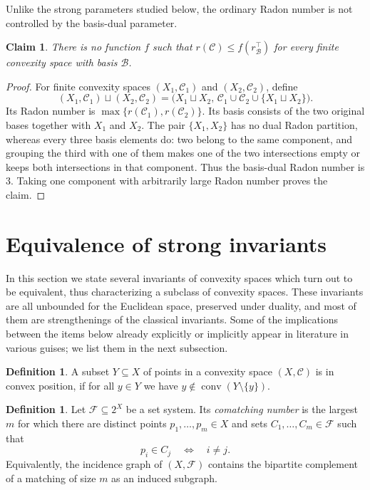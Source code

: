 \documentclass[11pt]{article}
\newtheorem{claim}[thm]{Claim}
\theoremstyle{definition}
\newtheorem{definition}[thm]{Definition}
\newcommand{\F}{\mathcal{F}}
\newcommand{\C}{\mathcal{C}}
\newcommand{\B}{\mathcal{B}}
\newcommand{\conv}{\operatorname{conv}}
\begin{document}
Unlike the strong parameters studied below, the ordinary Radon number is not controlled by the basis-dual parameter.

\begin{claim}\label{cl:noDualRadonBound}
There is no function $f$ such that $r(\C)\le f(r^\top_{\B})$ for every finite convexity space with basis $\B$.
\end{claim}

\begin{proof}
For finite convexity spaces $(X_1,\C_1)$ and $(X_2,\C_2)$, define
\[
(X_1,\C_1)\sqcup(X_2,\C_2)
=\bigl(X_1\sqcup X_2,\,\C_1\cup\C_2\cup\{X_1\sqcup X_2\}\bigr).
\]
Its Radon number is $\max\{r(\C_1),r(\C_2)\}$. Its basis consists of the two original bases together with $X_1$ and $X_2$. The pair $\{X_1,X_2\}$ has no dual Radon partition, whereas every three basis elements do: two belong to the same component, and grouping the third with one of them makes one of the two intersections empty or keeps both intersections in that component. Thus the basis-dual Radon number is $3$. Taking one component with arbitrarily large Radon number proves the claim.
\end{proof}

\section{Equivalence of strong invariants}\label{sec:strong}
In this section we state several invariants of convexity spaces which turn out to be equivalent, thus characterizing a subclass of convexity spaces.
These invariants are all unbounded for the Euclidean space, preserved under duality, and most of them are strengthenings of the classical invariants. Some of the implications between the items below already explicitly or implicitly appear in literature in various guises; we list them in the next subsection.

\begin{definition}
    A subset $Y\subseteq X$ of points in a convexity space $(X,\C)$ is in convex position, if for all $y \in Y$ we have $y \not\in \conv(Y\setminus\{y\})$.
\end{definition}

\begin{definition}
Let $\F\subseteq2^X$ be a set system. Its \emph{comatching number} is the largest $m$ for which there are distinct points $p_1,\ldots,p_m\in X$ and sets $C_1,\ldots,C_m\in\F$ such that
\[
p_i\in C_j\quad\Longleftrightarrow\quad i\ne j.
\]
Equivalently, the incidence graph of $(X,\F)$ contains the bipartite complement of a matching of size $m$ as an induced subgraph.
\end{definition}
\end{document}
